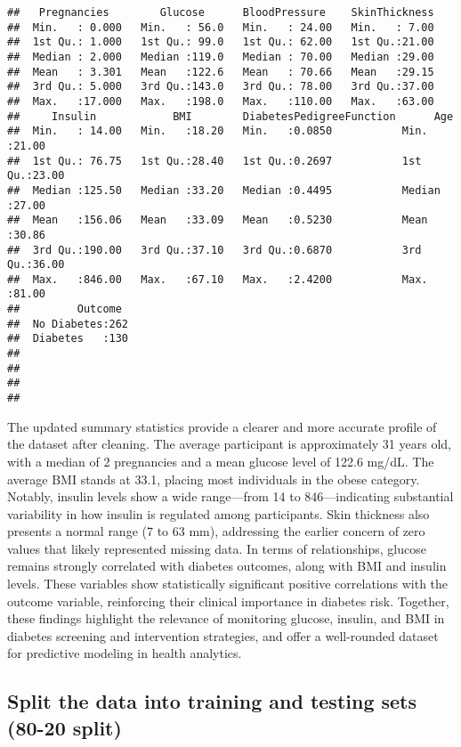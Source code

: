 \documentclass[
]{article}
\begin{document}
\begin{verbatim}
##   Pregnancies        Glucose      BloodPressure    SkinThickness  
##  Min.   : 0.000   Min.   : 56.0   Min.   : 24.00   Min.   : 7.00  
##  1st Qu.: 1.000   1st Qu.: 99.0   1st Qu.: 62.00   1st Qu.:21.00  
##  Median : 2.000   Median :119.0   Median : 70.00   Median :29.00  
##  Mean   : 3.301   Mean   :122.6   Mean   : 70.66   Mean   :29.15  
##  3rd Qu.: 5.000   3rd Qu.:143.0   3rd Qu.: 78.00   3rd Qu.:37.00  
##  Max.   :17.000   Max.   :198.0   Max.   :110.00   Max.   :63.00  
##     Insulin            BMI        DiabetesPedigreeFunction      Age       
##  Min.   : 14.00   Min.   :18.20   Min.   :0.0850           Min.   :21.00  
##  1st Qu.: 76.75   1st Qu.:28.40   1st Qu.:0.2697           1st Qu.:23.00  
##  Median :125.50   Median :33.20   Median :0.4495           Median :27.00  
##  Mean   :156.06   Mean   :33.09   Mean   :0.5230           Mean   :30.86  
##  3rd Qu.:190.00   3rd Qu.:37.10   3rd Qu.:0.6870           3rd Qu.:36.00  
##  Max.   :846.00   Max.   :67.10   Max.   :2.4200           Max.   :81.00  
##         Outcome   
##  No Diabetes:262  
##  Diabetes   :130  
##                   
##                   
##                   
## 
\end{verbatim}

The updated summary statistics provide a clearer and more accurate
profile of the dataset after cleaning. The average participant is
approximately 31 years old, with a median of 2 pregnancies and a mean
glucose level of 122.6 mg/dL. The average BMI stands at 33.1, placing
most individuals in the obese category. Notably, insulin levels show a
wide range---from 14 to 846---indicating substantial variability in how
insulin is regulated among participants. Skin thickness also presents a
normal range (7 to 63 mm), addressing the earlier concern of zero values
that likely represented missing data. In terms of relationships, glucose
remains strongly correlated with diabetes outcomes, along with BMI and
insulin levels. These variables show statistically significant positive
correlations with the outcome variable, reinforcing their clinical
importance in diabetes risk. Together, these findings highlight the
relevance of monitoring glucose, insulin, and BMI in diabetes screening
and intervention strategies, and offer a well-rounded dataset for
predictive modeling in health analytics.

\subsection{Split the data into training and testing sets (80-20
split)}\label{split-the-data-into-training-and-testing-sets-80-20-split}
\end{document}
